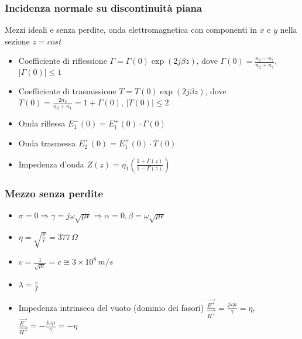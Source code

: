 \documentclass{article}
\begin{document}
\subsubsection{Incidenza normale su discontinuità piana}
Mezzi ideali e senza perdite, onda elettromagnetica con componenti in \( x \) e \( y \) nella sezione \( z = cost \)
\begin{itemize}
	\item Coefficiente di riflessione \( \Gamma = \Gamma(0) \exp(2 j \beta z)  \), dove \( \Gamma(0) = \frac{n_2 - n_1}{n_2 + n_1}\), \( | \Gamma(0) | \leq 1 \)
	\item Coefficiente di trasmissione \( T = T(0) \exp(2 j \beta z)  \), dove \( T(0) = \frac{2 n_2}{n_2 + n_1} = 1 + \Gamma(0)\), \( | T(0) | \leq 2 \)
	\item Onda riflessa \( E_1^-(0) =  E_1^+(0) \cdot \Gamma (0) \)
	\item Onda trasmessa \( E_2^+(0) =  E_1^+(0) \cdot T (0) \)
	\item Impedenza d'onda \( Z(z) = \eta_1 (\frac{1 + \Gamma(z)}{1 - \Gamma(z)}) \)
\end{itemize}


\subsubsection{Mezzo senza perdite}
\begin{itemize}
	\item \( \sigma = 0 \Rightarrow \gamma = j \omega \sqrt{\mu \epsilon} \Rightarrow \alpha = 0, \beta = \omega \sqrt{\mu \epsilon} \) 
	\item \( \eta = \sqrt{\frac{\mu}{\epsilon}}  = 377 \, \Omega \)
	\item \( v = \frac{1}{\sqrt{\mu \epsilon}} = c \cong 3\times10^8 \, m/s \)
	\item \( \lambda = \frac{v}{f} \)
	\item Impedenza intrinseca del vuoto (dominio dei fasori) \( \frac{\vec{E^+}}{\vec{H^+}} = \frac{j \omega \mu}{\gamma} = \eta \), \(\frac{\vec{E^-}}{\vec{H^-}} = - \frac{j \omega \mu}{\gamma} = - \eta\) 
\end{itemize}
\end{document}
